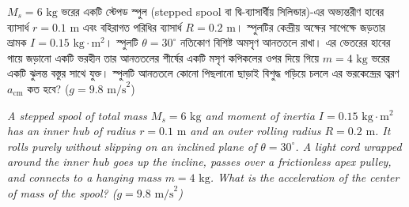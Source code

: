 \documentclass[12pt, a4paper]{article}
\begin{document}
\newpage

\begin{tcolorbox}[questionbox={প্রশ্ন (Question) 2}]
    \noindent
    $M_s = 6\text{ kg}$ ভরের একটি স্টেপড স্পুল (stepped spool বা দ্বি-ব্যাসার্ধীয় সিলিন্ডার)-এর অভ্যন্তরীণ হাবের ব্যাসার্ধ $r = 0.1\text{ m}$ এবং বহিরাগত পরিধির ব্যাসার্ধ $R = 0.2\text{ m}$। স্পুলটির কেন্দ্রীয় অক্ষের সাপেক্ষে জড়তার ভ্রামক $I = 0.15\text{ kg}\cdot\text{m}^2$। স্পুলটি $\theta = 30^\circ$ নতিকোণ বিশিষ্ট অমসৃণ আনততলে রাখা। এর ভেতরের হাবের গায়ে জড়ানো একটি ভরহীন তার আনততলের শীর্ষের একটি মসৃণ কপিকলের ওপর দিয়ে গিয়ে $m = 4\text{ kg}$ ভরের একটি ঝুলন্ত বস্তুর সাথে যুক্ত। স্পুলটি আনততলে কোনো পিছলানো ছাড়াই বিশুদ্ধ গড়িয়ে চললে এর ভরকেন্দ্রের ত্বরণ $a_{\text{cm}}$ কত হবে? ($g = 9.8\text{ m/s}^2$)
    
    \vspace{0.8em}
    \begin{english}
    \noindent\textit{\color{darkgray}
    A stepped spool of total mass $M_s = 6\text{ kg}$ and moment of inertia $I = 0.15\text{ kg}\cdot\text{m}^2$ has an inner hub of radius $r = 0.1\text{ m}$ and an outer rolling radius $R = 0.2\text{ m}$. It rolls purely without slipping on an inclined plane of $\theta = 30^\circ$. A light cord wrapped around the inner hub goes up the incline, passes over a frictionless apex pulley, and connects to a hanging mass $m = 4\text{ kg}$. What is the acceleration of the center of mass of the spool? ($g = 9.8\text{ m/s}^2$)
    }
    \end{english}
\end{tcolorbox}
\end{document}

